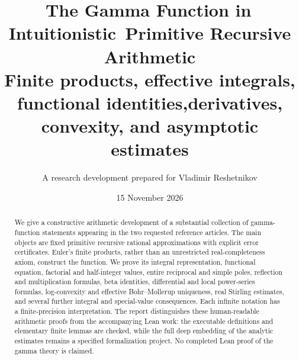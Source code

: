 \documentclass[11pt]{article}
\title{\color{ink}The Gamma Function in\, Intuitionistic\, Primitive Recursive Arithmetic\\[0.5em]\large Finite products, effective integrals, functional identities,\newline derivatives, convexity, and asymptotic estimates}
\author{A research development prepared for Vladimir Reshetnikov}
\date{15 November 2026}
\theoremstyle{definition}
\begin{document}
\maketitle
\begin{abstract}
We give a constructive arithmetic development of a substantial collection of
gamma-function statements appearing in the two requested reference articles.
The main objects are fixed primitive recursive rational approximations with
explicit error certificates. Euler's finite products, rather than an
unrestricted real-completeness axiom, construct the function. We prove its
integral representation, functional equation, factorial and half-integer
values, entire reciprocal and simple poles, reflection and multiplication
formulas, beta identities, differential and local power-series formulas,
log-convexity and effective Bohr--Mollerup uniqueness, real Stirling estimates,
and several further integral and special-value consequences. Each infinite
notation has a finite-precision interpretation. The report distinguishes
these human-readable arithmetic proofs from the accompanying Lean work:
the executable definitions and elementary finite lemmas are checked, while
the full deep embedding of the analytic estimates remains a specified
formalization project. No completed Lean proof of the gamma theory is claimed.
\end{abstract}
\tableofcontents
\newpage









\end{document}

